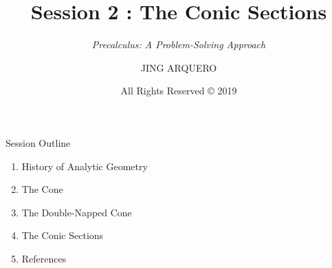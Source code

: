 \documentclass[14pt,aspectratio=169]{beamer}
\begin{document}
\title{Session 2 : The Conic Sections}
\subtitle{\textit{Precalculus: A Problem-Solving Approach}}
\author{JING ARQUERO}
\date{All Rights Reserved {\textrm{\copyright}} 2019}

\begin{frame}
 \maketitle
\end{frame}

\begin{frame}{Session Outline}
    \begin{enumerate}
     \item History of Analytic Geometry
     \item The Cone
     \item The Double-Napped Cone
     \item The Conic Sections
     \item References
    \end{enumerate}

\end{frame}
\end{document}
